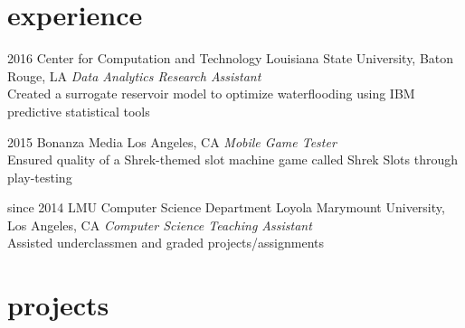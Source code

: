 \documentclass[]{friggeri-cv} %
\begin{document}

\section{experience}

  \begin{entrylist}


    \entry
      {2016}
      {Center for Computation and Technology}
      {Louisiana State University, Baton Rouge, LA}
      {\emph{Data Analytics Research Assistant} \\
	Created a surrogate reservoir model to optimize waterflooding using IBM predictive statistical tools}
	  

    \entry
      {2015}
      {Bonanza Media}
      {Los Angeles, CA}
      {\emph{Mobile Game Tester} \\
	Ensured quality of a Shrek-themed slot machine game called Shrek Slots through play-testing}


    \entry
      {since 2014}
      {LMU Computer Science Department}
      {Loyola Marymount University, Los Angeles, CA}
      {\emph{Computer Science Teaching Assistant} \\
        Assisted underclassmen and graded projects/assignments}


\end{entrylist}


\section{projects}
\end{document}

